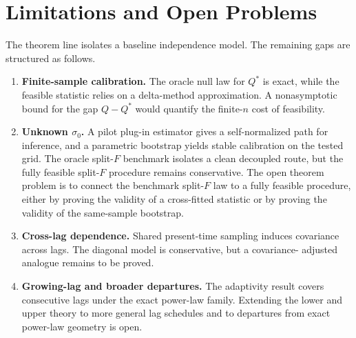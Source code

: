 \section{Limitations and Open Problems}
\label{sec:limitations}

The theorem line isolates a baseline independence model. The remaining gaps are
structured as follows.

\begin{enumerate}[leftmargin=*,label=(\arabic*)]
\item \textbf{Finite-sample calibration.} The oracle null law for $Q^*$ is exact,
while the feasible statistic relies on a delta-method approximation. A
nonasymptotic bound for the gap $Q-Q^*$ would quantify the finite-$n$ cost of
feasibility.

\item \textbf{Unknown $\sigma_0$.} A pilot plug-in estimator gives a
self-normalized path for inference, and a parametric bootstrap yields stable
calibration on the tested grid. The oracle split-$F$ benchmark isolates a clean
decoupled route, but the fully feasible split-$F$ procedure remains
conservative. The open theorem problem is to connect the benchmark split-$F$
law to a fully feasible procedure, either by proving the validity of a
cross-fitted statistic or by proving the validity of the same-sample bootstrap.

\item \textbf{Cross-lag dependence.} Shared present-time sampling induces
covariance across lags. The diagonal model is conservative, but a covariance-
adjusted analogue remains to be proved.

\item \textbf{Growing-lag and broader departures.} The adaptivity result covers
consecutive lags under the exact power-law family. Extending the lower
and upper theory to more general lag schedules and to departures from exact
power-law geometry is open.
\end{enumerate}
